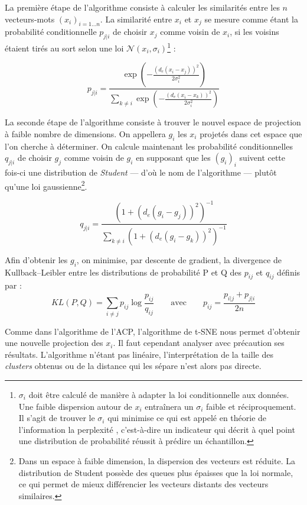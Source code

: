 \documentclass[11pt,french,french]{article}
\let\rmarkdownfootnote\footnote%
\def\footnote{\protect\rmarkdownfootnote}
\begin{document}
La première étape de l'algorithme consiste à calculer les similarités
entre les \(n\) vecteurs-mots \((x_i)_{i=1...n}\). La similarité entre
\(x_i\) et \(x_j\) se mesure comme étant la probabilité conditionnelle
\(p_{j|i}\) de choisir \(x_j\) comme voisin de \(x_i\), si les voisins
étaient tirés au sort selon une loi
\(\mathcal{N}(x_i, \sigma_i)\)\footnote{\(\sigma_i\) doit être calculé
  de manière à adapter la loi conditionnelle aux données. Une faible
  dispersion autour de \(x_i\) entraînera un \(\sigma_i\) faible et
  réciproquement. Il s'agit de trouver le \(\sigma_i\) qui minimise ce
  qui est appelé en théorie de l'information la \og perplexité \fg{},
  c'est-à-dire un indicateur qui décrit à quel point une distribution de
  probabilité réussit à prédire un échantillon.} :

\[ p_{j|i} = \frac{
\exp\left(-\frac{(d_e(x_i - x_j))^2}{2\sigma_i^2}\right)
}{
\sum_{k \neq i}
\exp\left(-\frac{(d_e(x_i - x_k))^2}{2\sigma_i^2}\right)
}\]

La seconde étape de l'algorithme consiste à trouver le nouvel espace de
projection à faible nombre de dimensions. On appellera \(g_i\) les
\(x_i\) projetés dans cet espace que l'on cherche à déterminer. On
calcule maintenant les probabilité conditionnelles \(q_{j|i}\) de
choisir \(g_j\) comme voisin de \(g_i\) en supposant que les \((g_i)_i\)
suivent cette fois-ci une distribution de \emph{Student} --- d'où le nom
de l'algorithme --- plutôt qu'une loi gaussienne\footnote{Dans un espace
  à faible dimension, la dispersion des vecteurs est réduite. La
  distribution de Student possède des queues plus épaisses que la loi
  normale, ce qui permet de mieux différencier les vecteurs distants des
  vecteurs similaires.}.

\[ q_{j|i} = \frac{(1+ (d_e(g_i - g_j))^2)^{-1}}{\sum_{k \neq i}{(1+ (d_e(g_i - g_k))^2)^{-1}}}\]

Afin d'obtenir les \(g_i\), on minimise, par descente de gradient, la
divergence de Kullback--Leibler entre les distributions de probabilité P
et Q des \(p_{ij}\) et \(q_{ij}\) définis par :
\[KL(P,Q) = \sum_{i \neq j} { p_{ij} \log{\frac{p_{ij}}{q_{ij}}}} \qquad\text{avec}\qquad p_{ij} = \frac{p_{i|j} + p_{j|i}}{2n}\]

Comme dans l'algorithme de l'ACP, l'algorithme de t-SNE nous permet
d'obtenir une nouvelle projection des \(x_i\). Il faut cependant
analyser avec précaution ses résultats. L'algorithme n'étant pas
linéaire, l'interprétation de la taille des \emph{clusters} obtenus ou
de la distance qui les sépare n'est alors pas directe.
\end{document}
